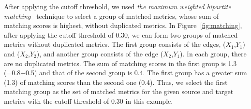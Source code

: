 After applying the cutoff threshold, we
used {\em the maximum weighted bipartite matching}~\cite{Matouek06} technique to
select a group of matched metrics, whose sum of matching scores is highest,
without duplicated metrics.
In Figure~\ref{fig:matching}, after applying the cutoff threshold of 0.30, we
can form two groups of matched metrics without duplicated metrics. The first
group consists of the edges, ($X_1$,$Y_1$) and ($X_2$,$Y_2$), and another group
consists of the edge ($X_2$,$Y_1$). In each group, there are no duplicated
metrics. The sum of matching scores in the first group is 1.3 (=0.8+0.5) and that of the second
group is 0.4.
The first group has a greater sum (1.3) of matching scores than the
second one (0.4). Thus, we select the first matching group as the set of
matched metrics for the given source and target metrics with the cutoff
threshold of 0.30 in this example.

%







